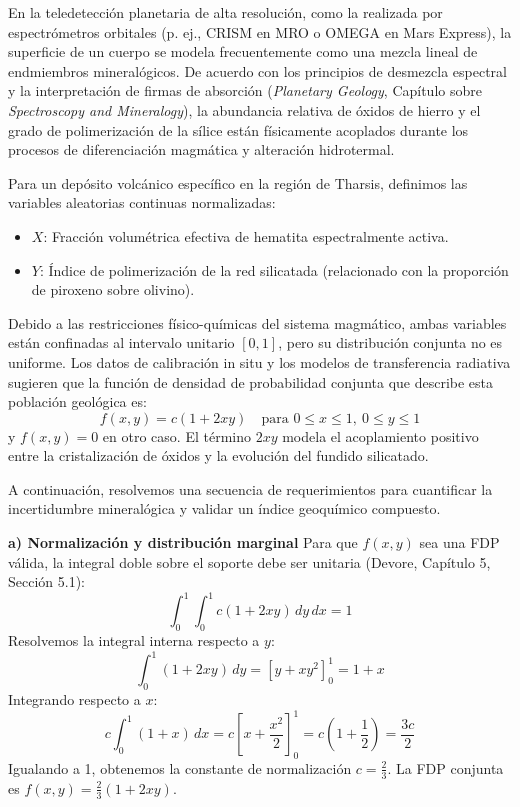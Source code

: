 En la teledetección planetaria de alta resolución, como la realizada por espectrómetros orbitales (p. ej., CRISM en MRO o OMEGA en Mars Express), la superficie de un cuerpo se modela frecuentemente como una mezcla lineal de endmiembros mineralógicos. De acuerdo con los principios de desmezcla espectral y la interpretación de firmas de absorción (\textit{Planetary Geology}, Capítulo sobre \textit{Spectroscopy and Mineralogy}), la abundancia relativa de óxidos de hierro y el grado de polimerización de la sílice están físicamente acoplados durante los procesos de diferenciación magmática y alteración hidrotermal.

Para un depósito volcánico específico en la región de Tharsis, definimos las variables aleatorias continuas normalizadas:
\begin{itemize}
    \item $X$: Fracción volumétrica efectiva de hematita espectralmente activa.
    \item $Y$: Índice de polimerización de la red silicatada (relacionado con la proporción de piroxeno sobre olivino).
\end{itemize}

Debido a las restricciones físico-químicas del sistema magmático, ambas variables están confinadas al intervalo unitario $[0, 1]$, pero su distribución conjunta no es uniforme. Los datos de calibración in situ y los modelos de transferencia radiativa sugieren que la función de densidad de probabilidad conjunta que describe esta población geológica es:
$$
f(x,y) = c(1 + 2xy) \quad \text{para } 0 \le x \le 1, \ 0 \le y \le 1
$$
y $f(x,y) = 0$ en otro caso. El término $2xy$ modela el acoplamiento positivo entre la cristalización de óxidos y la evolución del fundido silicatado.

A continuación, resolvemos una secuencia de requerimientos para cuantificar la incertidumbre mineralógica y validar un índice geoquímico compuesto.

\textbf{a) Normalización y distribución marginal}
Para que $f(x,y)$ sea una FDP válida, la integral doble sobre el soporte debe ser unitaria (Devore, Capítulo 5, Sección 5.1):
$$ \int_{0}^{1} \int_{0}^{1} c(1 + 2xy) \, dy \, dx = 1 $$
Resolvemos la integral interna respecto a $y$:
$$ \int_{0}^{1} (1 + 2xy) \, dy = \left[ y + xy^2 \right]_{0}^{1} = 1 + x $$
Integrando respecto a $x$:
$$ c \int_{0}^{1} (1 + x) \, dx = c \left[ x + \frac{x^2}{2} \right]_{0}^{1} = c \left( 1 + \frac{1}{2} \right) = \frac{3c}{2} $$
Igualando a 1, obtenemos la constante de normalización $c = \frac{2}{3}$. La FDP conjunta es $f(x,y) = \frac{2}{3}(1 + 2xy)$.

